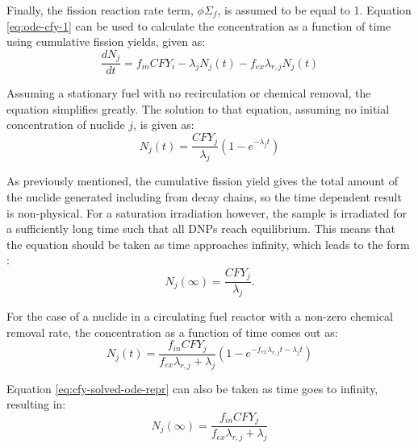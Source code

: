 Finally, the fission reaction rate term, $\phi \Sigma_f$, is assumed to be equal to 1.
Equation \eqref{eq:ode-cfy-1} can be used to calculate the concentration as a function of time using cumulative fission yields, given as:
\begin{equation}
    \frac{dN_j}{dt} = f_{in} CFY_i - \lambda_{j} N_j(t) - f_{ex} \lambda_{r, j}N_j(t)
    \label{eq:ode-cfy-1}
\end{equation}

Assuming a stationary fuel with no recirculation or chemical removal, the equation simplifies greatly.
The solution to that equation, assuming no initial concentration of nuclide $j$, is given as:
\begin{equation}
    N_j(t) = \frac{CFY_j}{\lambda_j} \left( 1 - e^{-\lambda_j t}\right)
    \label{eq:cfy-solved-ode}
\end{equation}

As previously mentioned, the cumulative fission yield gives the total amount of the nuclide generated including from decay chains, so the time dependent result is non-physical.
For a saturation irradiation however, the sample is irradiated for a sufficiently long time such that all \glspl{DNP} reach equilibrium.
This means that the equation should be taken as time approaches infinity, which leads to the form \cite{huynh2014calculation}:
\begin{equation}
    N_j(\infty) = \frac{CFY_j}{\lambda_j}.
\end{equation}

For the case of a nuclide in a circulating fuel reactor with a non-zero chemical removal rate, the concentration as a function of time comes out as:
\begin{equation}
    N_j(t) = \frac{f_{in} CFY_j}{f_{ex}\lambda_{r, j} + \lambda_j} \left( 1 - e^{-f_{ex} \lambda_{r, j} t -\lambda_j t}\right)
    \label{eq:cfy-solved-ode-repr}
\end{equation}

Equation \eqref{eq:cfy-solved-ode-repr} can also be taken as time goes to infinity, resulting in:
\begin{equation}
    N_j(\infty) = \frac{f_{in} CFY_j}{f_{ex}\lambda_{r, j} + \lambda_j}
\end{equation}
